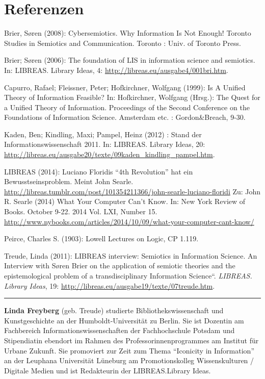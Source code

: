 \documentclass[a4paper,
fontsize=11pt,
oneside,
numbers=noperiodatend,
parskip=half-,
bibliography=totoc,
final
]{scrartcl}
\begin{document}
\section*{Referenzen}\label{referenzen}

Brier, Søren (2008): Cybersemiotics. Why Information Is Not Enough!
Toronto Studies in Semiotics and Communication. Toronto : Univ. of
Toronto Press.

Brier; Søren (2006): The foundation of LIS in information science and
semiotics. In: LIBREAS. Library Ideas, 4:
\url{http://libreas.eu/ausgabe4/001bri.htm}.

Capurro, Rafael; Fleissner, Peter; Hofkirchner, Wolfgang (1999): Is A
Unified Theory of Information Feasible? In: Hofkirchner, Wolfgang
(Hrsg.): The Quest for a Unified Theory of Information. Proceedings of
the Second Conference on the Foundations of Information Science.
Amsterdam etc. : Gordon\&Breach, 9-30.

Kaden, Ben; Kindling, Maxi; Pampel, Heinz (2012) : Stand der
Informationswissenschaft 2011. In: LIBREAS. Library Ideas, 20:
\url{http://libreas.eu/ausgabe20/texte/09kaden_kindling_pampel.htm}.

LIBREAS (2014): Luciano Floridis \enquote{4th Revolution} hat ein
Bewusstseinsproblem. Meint John Searle.
\url{http://libreas.tumblr.com/post/101354211366/john-searle-luciano-floridi}
Zu: John R. Searle (2014) What Your Computer Can't Know. In: New York
Review of Books. October 9-22. 2014 Vol. LXI, Number 15.
\url{http://www.nybooks.com/articles/2014/10/09/what-your-computer-cant-know/}

Peirce, Charles S. (1903): Lowell Lectures on Logic, CP 1.119.

Treude, Linda (2011): LIBREAS interview: Semiotics in Information
Science. An Interview with Søren Brier on the application of semiotic
theories and the epistemological problem of a transdisciplinary
Information Science``. \emph{LIBREAS. Library Ideas}, 19:
\url{http://libreas.eu/ausgabe19/texte/07treude.htm}.

\begin{center}\rule{0.5\linewidth}{\linethickness}\end{center}

\textbf{Linda Freyberg} (geb. Treude) studierte Bibliothekswissenschaft
und Kunstgeschichte an der Humboldt-Universität zu Berlin. Sie ist
Dozentin am Fachbereich Informationswissenschaften der Fachhochschule
Potsdam und Stipendiatin ebendort im Rahmen des Professorinnenprogrammes
am Institut für Urbane Zukunft. Sie promoviert zur Zeit zum Thema
``Iconicity in Information'' an der Leuphana Universität Lüneburg am
Promotionskolleg Wissenskulturen / Digitale Medien und ist Redakteurin
der LIBREAS.Library Ideas.
\end{document}
